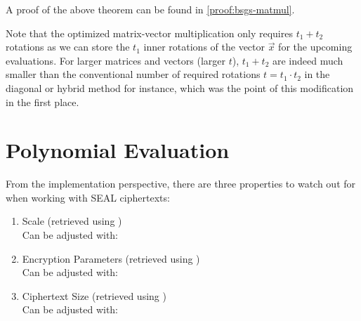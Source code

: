 A proof of the above theorem can be found in \cref{proof:bsgs-matmul}.

Note that the optimized matrix-vector multiplication only requires $t_1 + t_2$ rotations as we can store the $t_1$ inner rotations of the vector $\vec{x}$ for the upcoming evaluations.
For larger matrices and vectors (larger $t$), $t_1 + t_2$ are indeed much smaller than the conventional number of required rotations $t = t_1 \cdot t_2$ in the diagonal or hybrid method for instance, which was the point of this modification in the first place.

\section{Polynomial Evaluation}
From the implementation perspective, there are three properties to watch out for when working with SEAL ciphertexts:

\begin{enumerate}
  \item Scale (retrieved using ) \\
        Can be adjusted with: 
  \item Encryption Parameters (retrieved using ) \\
        Can be adjusted with: 
  \item Ciphertext Size (retrieved using ) \\
        Can be adjusted with: 
\end{enumerate}


